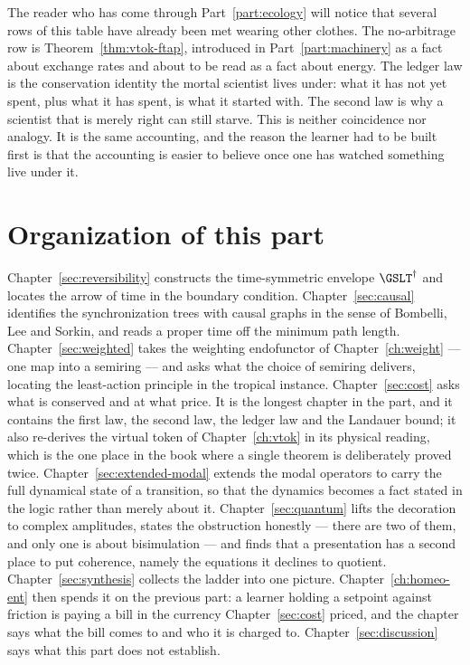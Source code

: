 The reader who has come through Part~\ref{part:ecology} will notice that
several rows of this table have already been met wearing other clothes.
The no-arbitrage row is Theorem~\ref{thm:vtok-ftap}, introduced in
Part~\ref{part:machinery} as a fact about exchange rates and about to be
read as a fact about energy.
The ledger law is the conservation identity the mortal scientist lives
under: what it has not yet spent, plus what it has spent, is what it
started with.
The second law is why a scientist that is merely right can still starve.
This is neither coincidence nor analogy.
It is the same accounting, and the reason the learner had to be built
first is that the accounting is easier to believe once one has watched
something live under it.

\section{Organization of this part}

Chapter~\ref{sec:reversibility} constructs the time-symmetric envelope
$\GSLT^\dagger$ and locates the arrow of time in the boundary condition.
Chapter~\ref{sec:causal} identifies the synchronization trees with causal
graphs in the sense of Bombelli, Lee and Sorkin, and reads a proper time
off the minimum path length.
Chapter~\ref{sec:weighted} takes the weighting endofunctor of
Chapter~\ref{ch:weight} --- one map into a semiring --- and asks what the
choice of semiring delivers, locating the least-action principle in the
tropical instance.
Chapter~\ref{sec:cost} asks what is conserved and at what price.
It is the longest chapter in the part, and it contains the first law, the
second law, the ledger law and the Landauer bound; it also re-derives the
virtual token of Chapter~\ref{ch:vtok} in its physical reading, which is
the one place in the book where a single theorem is deliberately proved
twice.
Chapter~\ref{sec:extended-modal} extends the modal operators to carry the
full dynamical state of a transition, so that the dynamics becomes a fact
stated in the logic rather than merely about it.
Chapter~\ref{sec:quantum} lifts the decoration to complex amplitudes,
states the obstruction honestly --- there are two of them, and only one is
about bisimulation --- and finds that a presentation has a second place to
put coherence, namely the equations it declines to quotient.
Chapter~\ref{sec:synthesis} collects the ladder into one picture.
Chapter~\ref{ch:homeo-ent} then spends it on the previous part: a learner
holding a setpoint against friction is paying a bill in the currency
Chapter~\ref{sec:cost} priced, and the chapter says what the bill comes
to and who it is charged to.
Chapter~\ref{sec:discussion} says what this part does not establish.

